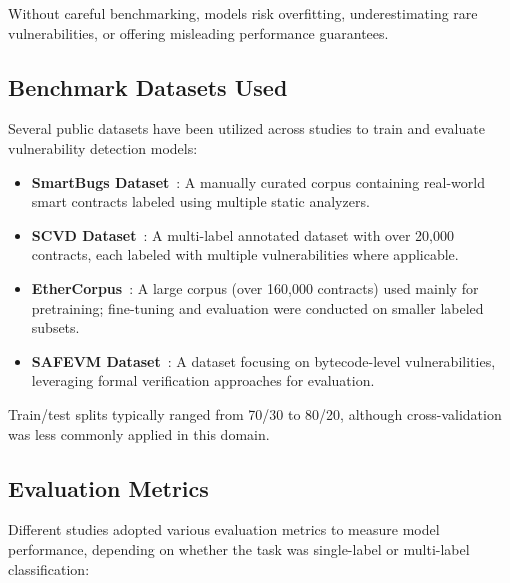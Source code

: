 Without careful benchmarking, models risk overfitting, underestimating rare vulnerabilities, or offering misleading performance guarantees.

\subsection*{Benchmark Datasets Used}

Several public datasets have been utilized across studies to train and evaluate vulnerability detection models:

\begin{itemize}
    \item \textbf{SmartBugs Dataset}~\cite{durieux2020empirical}: A manually curated corpus containing real-world smart contracts labeled using multiple static analyzers.
    
    \item \textbf{SCVD Dataset}~\cite{zhang2020scvd}: A multi-label annotated dataset with over 20,000 contracts, each labeled with multiple vulnerabilities where applicable.
    
    \item \textbf{EtherCorpus}~\cite{tann2020towards}: A large corpus (over 160,000 contracts) used mainly for pretraining; fine-tuning and evaluation were conducted on smaller labeled subsets.
    
    \item \textbf{SAFEVM Dataset}~\cite{albert2019safevm}: A dataset focusing on bytecode-level vulnerabilities, leveraging formal verification approaches for evaluation.
\end{itemize}

Train/test splits typically ranged from 70/30 to 80/20, although cross-validation was less commonly applied in this domain.

\subsection*{Evaluation Metrics}

Different studies adopted various evaluation metrics to measure model performance, depending on whether the task was single-label or multi-label classification:

